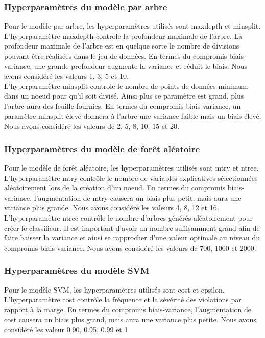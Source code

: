 \subsubsection{Hyperparamètres du modèle par arbre}
Pour le modèle par arbre, les hyperparamètres utilisés sont maxdepth et minsplit. \\
L'hyperparamètre maxdepth controle la profondeur maximale de l'arbre. La profondeur maximale de l'arbre est en quelque sorte le nombre de divisions pouvant être réalisées dans le jeu de données. En termes du compromis biais-variance, une grande profondeur augmente la variance et réduit le biais. Nous avons considéré les valeurs 1, 3, 5 et 10.\\
L'hyperparamètre minsplit controle le nombre de points de données minimum dans un noeud pour qu'il soit divisé. Ainsi plus ce paramètre est grand, plus l'arbre aura des feuille fournies. En termes du compromis biais-variance, un paramètre minsplit élevé donnera à l'arbre une variance faible mais un biais élevé. Nous avons considéré les valeurs de 2, 5, 8, 10, 15 et 20.

\subsubsection{Hyperparamètres du modèle de forêt aléatoire}
Pour le modèle de forêt aléatoire, les hyperparamètres utilisés sont mtry et ntree.\\
L'hyperparamètre mtry contrôle le nombre de variables explicatives sélectionnées aléatoirement lors de la création d'un noeud. En termes du compromis biais-variance, l'augmentation de mtry causera un biais plus petit, mais aura une variance plus grande.  Nous avons considéré les valeurs 4, 8, 12 et 16.\\
L'hyperparamètre ntree contrôle le nombre d'arbres générés aléatoirement pour créer le classifieur. Il est important d'avoir un nombre suffisamment grand afin de faire baisser la variance et ainsi se rapprocher d'une valeur optimale au niveau du compromis biais-variance. Nous avons considéré les valeurs de 700, 1000 et 2000.

\subsubsection{Hyperparamètres du modèle SVM}
Pour le modèle SVM, les hyperparamètres utilisés sont cost et epsilon.\\
L'hyperparamètre cost contrôle la fréquence et la sévérité des violations par rapport à la marge. En termes du compromis biais-variance, l'augmentation de cost causera un biais plus grand, mais aura une variance plus petite. Nous avons considéré les valeur 0.90, 0.95, 0.99 et 1.\\

